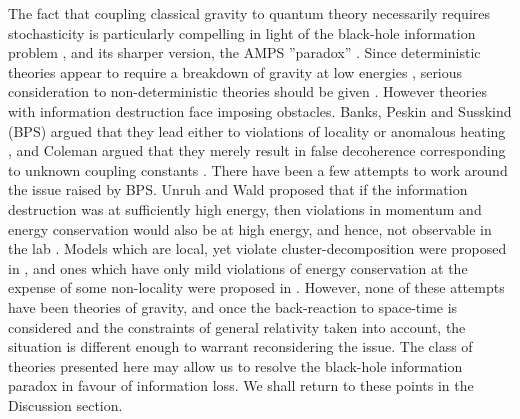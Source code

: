 \documentclass[aps,pra,showpacs,citeautoscript,amsmath,amssymb,floatfix,superscriptaddress,bbm, verbatim,amsfonts,changes,11pt,nofootinbib,longbibliography]{revtex4-2}
\begin{document}
The fact that coupling classical gravity to quantum theory necessarily requires stochasticity \cite{stochasticity_foot} %
 is particularly compelling in light of the black-hole information problem \cite{hawking-bhinfoloss,hawking-unpredictability,preskill-infoloss-note}, and its sharper version, the AMPS ''paradox''  \cite{almheiri2013black,braunstein2009entangled}. Since deterministic theories appear to require a breakdown of gravity at low energies \cite{energies_foot}, serious consideration to non-deterministic theories should be given \cite{ellis1984search}. However theories with information destruction face imposing obstacles. \label{par:introchallenge} Banks, Peskin and Susskind (BPS) argued that they lead either to violations of locality or anomalous heating
 \cite{bps,gross1984quantum}, and Coleman argued that they merely result in false decoherence corresponding to unknown coupling constants \cite{coleman1988black}. 
\label{par:ibps}There have been a few attempts to work around the issue raised by BPS. 
Unruh and Wald proposed that if the
information destruction was at sufficiently high energy, then violations in momentum and energy conservation 
would also be at high energy, and hence, not observable in the lab \cite{unruh-wald-onbps}. Models which are local, yet violate 
cluster-decomposition \cite{cluster_foot}
were proposed in  \cite{OR-intrinsic}, and ones which have only mild violations of energy conservation at the expense of some non-locality were proposed in  \cite{poulinKITP}. 
However, none of these attempts have been theories of gravity, and once the back-reaction to space-time is considered and the constraints of general relativity taken into account, the situation is different enough to warrant reconsidering the issue. The class of theories presented here may allow us to resolve the black-hole information paradox in favour of information loss. We shall return to these points in the Discussion section.
\end{document}
